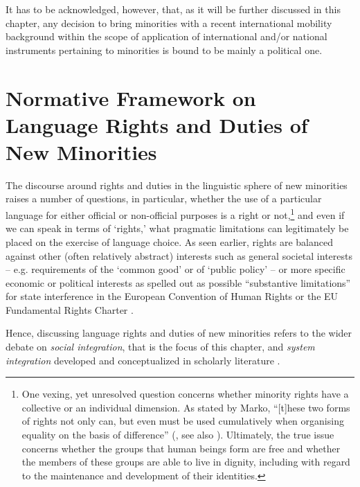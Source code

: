 \documentclass[output=paper,colorlinks,citecolor=brown]{langscibook}
\begin{document}
It has to be acknowledged, however, that, as it will be further discussed in this chapter, any decision to bring minorities with a recent international mobility background within the scope of application of international and/or national instruments pertaining to minorities is bound to be mainly a political one.

\section{Normative Framework on Language Rights and Duties of New Minorities}\label{ch2.4.ss.3}

The discourse around rights and duties in the linguistic sphere of new minorities raises a number of questions, in particular, whether the use of a particular language for either official or non-official purposes is a right or not,\footnote{One vexing, yet unresolved question concerns whether minority rights have a collective or an individual dimension. As stated by Marko, ``[t]hese two forms of rights not only can, but even must be used cumulatively when organising equality on the basis of difference'' (\citealt{marko1997}, see also \citealt{hofmann1998}). Ultimately, the true issue concerns whether the groups that human beings form are free and whether the members of these groups are able to live in dignity, including with regard to the maintenance and development of their identities.} and even if we can speak in terms of `rights,' what pragmatic limitations can legitimately be placed on the exercise of language choice. As seen earlier, rights are balanced against other (often relatively abstract) interests such as general societal interests – e.g. requirements of the `common good' or of `public policy' – or more specific economic or political interests as spelled out as possible ``substantive limitations'' for state interference in the European Convention of Human Rights or the EU Fundamental Rights Charter \citep{shuibhne2002}.

Hence, discussing language rights and duties of new minorities refers to the wider debate on \textit{social integration}, that is the focus of this chapter, and \textit{system integration} developed and conceptualized in scholarly literature \citep{marko_constantin2019,gordon1964,berry1997_again,esser2001_integration}.
\end{document}

